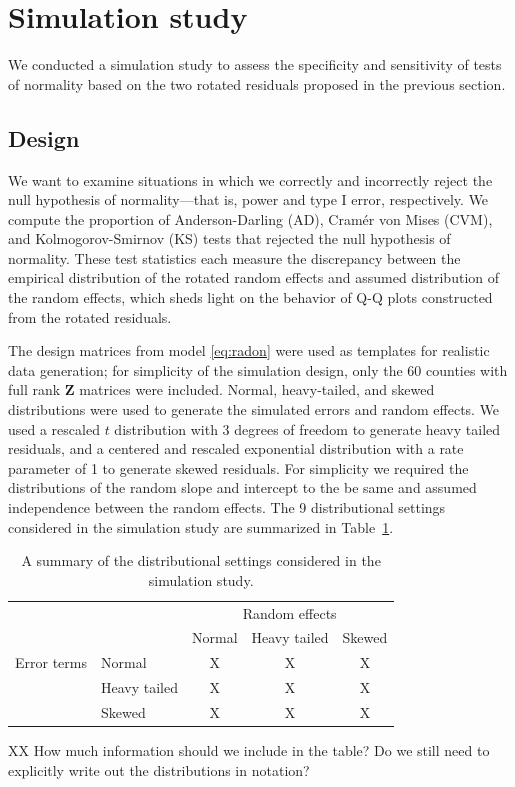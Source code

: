 \documentclass[12pt]{article} %
\newcommand{\hh}[1]{{\color{orange} #1}}
\newcommand{\al}[1]{{\color{red} #1}}
\begin{document}
\section{Simulation study}\label{sec:simulation}

We conducted a simulation study to assess the specificity and sensitivity of tests of normality based on the two rotated residuals proposed in the previous section. 

\subsection{Design}\label{sec:sim-design}

\hh{We want} to examine situations in which we correctly and incorrectly reject the null hypothesis of normality---that is, power and type I error, respectively. \hh{We compute the proportion of Anderson-Darling (AD), Cram{\'e}r von Mises (CVM), and Kolmogorov-Smirnov (KS) tests that rejected the null hypothesis of normality.
}
 These test statistics each measure the discrepancy between the empirical distribution of the rotated random effects and assumed distribution of the random effects, which sheds light on the behavior of Q-Q plots constructed from the rotated residuals. 


The design matrices from model \eqref{eq:radon} were used as templates for realistic data generation;  for simplicity of the simulation design, only the 60 counties with full rank $\bm{Z}$ matrices were included. 
\al{Normal, heavy-tailed, and skewed distributions were used to generate the simulated errors and random effects. We used a rescaled $t$ distribution with 3 degrees of freedom to generate heavy tailed residuals, and a centered and rescaled exponential distribution with a rate parameter of 1 to generate skewed residuals. For simplicity we required the distributions of the random slope and intercept to the be same and assumed independence between the random effects. The 9 distributional settings considered in the simulation study are summarized in Table~\ref{tab:simdsns}.}

\begin{table}[htdp]
\centering
\caption{\label{tab:simdsns} A summary of the distributional settings considered in the simulation study.}
\begin{tabular}{llccc}\hline
& & \multicolumn{3}{c}{Random effects} \\ 
           & & Normal & Heavy tailed & Skewed \\ \hline
Error terms  & Normal       & X & X & X \\
             & Heavy tailed & X & X & X \\
             & Skewed       & X & X & X \\ 
\hline
\end{tabular} 
\end{table}
\al{XX How much information should we include in the table? Do we still need to explicitly write out the distributions in notation?}
\end{document}
